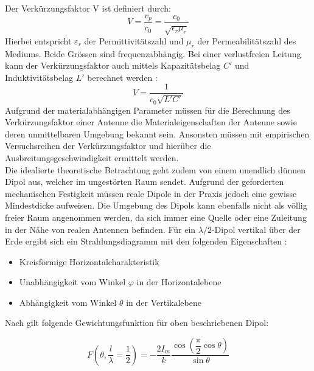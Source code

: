 Der Verkürzungsfaktor V ist definiert durch:
\begin{equation}
V=\dfrac{v_p}{c_0}=\dfrac{c_0}{\sqrt{\epsilon_r \mu_r}}
\end{equation}
Hierbei entspricht $\varepsilon_r$ der Permittivitätszahl und $\mu_r$ der Permeabilitätszahl des Mediums. Beide Grössen sind frequenzabhängig. Bei einer verlustfreien Leitung kann der Verkürzungsfaktor auch mittels Kapazitätsbelag $C'$ und Induktivitätsbelag $L'$ berechnet werden \cite{Verkuertzungsfaktor_wiki}:
\begin{equation}\label{V_verlustfreie_Leitung}
V=\dfrac{1}{c_0 \sqrt{L'C'}} 
\end{equation}
Aufgrund der materialabhängigen Parameter müssen für die Berechnung des Verkürzungsfaktor einer Antenne die Materialeigenschaften der Antenne sowie deren unmittelbaren Umgebung bekannt sein. Ansonsten müssen mit empirischen Versuchsreihen der Verkürzungsfaktor und hierüber die Ausbreitungsgeschwindigkeit ermittelt werden.\\

Die idealierte theoretische Betrachtung geht zudem von einem unendlich dünnen Dipol aus, welcher im ungestörten Raum sendet. Aufgrund der geforderten mechanischen Festigkeit müssen reale Dipole in der Praxis jedoch eine gewisse Mindestdicke aufweisen. Die Umgebung des Dipols kann ebenfalls nicht als völlig freier Raum angenommen werden, da sich immer eine Quelle oder eine Zuleitung in der Nähe von realen Antennen befinden. Für ein $\lambda /2$-Dipol vertikal über der Erde ergibt sich ein Strahlungsdiagramm mit den folgenden Eigenschaften  \cite{zinke1965lehrbuch}: 
\begin{itemize}
\item Kreisförmige Horizontalcharakteristik
\item Unabhängigkeit vom Winkel $\varphi$ in der Horizontalebene
\item Abhängigkeit vom Winkel $\theta$ in der Vertikalebene
\end{itemize}
Nach \cite{elliott1981antenna} gilt folgende Gewichtungsfunktion für oben beschriebenen Dipol:

\begin{equation}\label{eq:FDipolTheat}
F(\theta,\frac{l}{\lambda}=\dfrac{1}{2})=-\dfrac{2I_{m}}{k}\dfrac{\cos\left(\dfrac{\pi}{2}\cos\theta\right)}{\sin\theta}
\end{equation}

